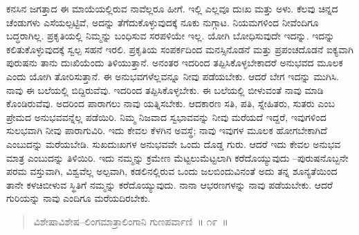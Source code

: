 ಕನಸಿನ ಜಗತ್ತಾದ ಈ ಮಾಯೆಯಲ್ಲಿರುವ ನಾವೆಲ್ಲರೂ ಹೀಗೆ. ಇಲ್ಲಿ ಎಲ್ಲವೂ ದುಃಖ ಮತ್ತು ಅಳು. ಕೆಲವು ಚಿನ್ನದ ಚೆಂಡುಗಳು ಎಸೆಯಲ್ಪಟ್ಟಿವೆ, ಅದನ್ನು ತೆಗೆದುಕೊಳ್ಳುವುದಕ್ಕೆ ನೂಕು ನುಗ್ಗಾಟ. ನಿಯಮಗಳಿಂದ ನೀವೆಂದಿಗೂ ಬದ್ಧರಾಗಿಲ್ಲ. ಪ್ರಕೃತಿಯಲ್ಲಿ ನಿಮ್ಮನ್ನು ಬಂಧಿಸುವ ಸರಪಳಿಯೇ ಇಲ್ಲ. ಯೋಗಿ ಬೋಧಿಸುವುದೇ ಇದನ್ನು. ಇದನ್ನು ಕಲಿತುಕೊಳ್ಳುವುದಕ್ಕೆ ಸ್ವಲ್ಪ ಸಹನೆ ಇರಲಿ. ಪ್ರಕೃತಿಯ ಸಂಪರ್ಕದಿಂದ ಮನಸ್ಸಿನೊಡನೆ ಮತ್ತು ಪ್ರಪಂಚದೊಡನೆ ಐಕ್ಯವಾಗಿ ಪುರುಷನು ತಾನು ದುಃಖಿಯೆಂದು ತಿಳಿಯುತ್ತಾನೆ. ಅನಂತರ ಇದರಿಂದ ತಪ್ಪಿಸಿಕೊಳ್ಳಬೇಕಾದರೆ ಅನುಭವದ ಮೂಲಕ ಎಂದು ಯೋಗಿ ತೋರಿಸುತ್ತಾನೆ. ಈ ಅನುಭವಗಳೆಲ್ಲವನ್ನೂ ನೀವು ಪಡೆಯಬೇಕು. ಆದರೆ ಬೇಗ ಇದನ್ನು ಮುಗಿಸಿ. ನಾವು ಈ ಬಲೆಯಲ್ಲಿ ಬಿದ್ದಿರುವೆವು. ಇದರಿಂದ ತಪ್ಪಿಸಿಕೊಳ್ಳಬೇಕು. ಈ ಬಲೆಯಲ್ಲಿ ಬೀಳುವಂತೆ ನಾವು ಮಾಡಿ ಕೊಂಡಿರುವೆವು. ಅದರಿಂದ ಪಾರಾಗಲು ನಾವು ಯತ್ನಿಸಬೇಕು. ಆದಕಾರಣ ಸತಿ, ಪತಿ, ಸ್ನೇಹಿತರು, ಸುತರು ಎಂಬ ಪ್ರೇಮದ ಅನುಭವವನ್ನೆಲ್ಲ ಪಡೆಯಿರಿ. ನಿಮ್ಮ ನಿಜವಾದ ಸ್ವಭಾವವನ್ನು ನೀವು ಮರೆಯದೆ ಇದ್ದರೆ, ಇವುಗಳಿಂದ ಸುಲಭವಾಗಿ ನೀವು ಪಾರಾಗುವಿರಿ. ಇದು ಕೇವಲ ಕೆಳಗಿನ ಅವಸ್ಥೆ; ನಾವು ಇವುಗಳ ಮೂಲಕ ಹೋಗಬೇಕಾಗಿದೆ ಎಂಬುದನ್ನು ಮರೆಯಬೇಡಿ. ಸುಖದುಃಖಗಳ ಅನುಭವವೇ ಒಂದು ದೊಡ್ಡ ಗುರು. ಆದರೆ ಇದು ಕೇವಲ ಅನುಭವ ಮಾತ್ರ ಎಂಬುದನ್ನು ತಿಳಿಯಿರಿ. ಇದು ನಮ್ಮನ್ನು ಕ್ರಮೇಣ ಮೆಟ್ಟಲುಮೆಟ್ಟಲಾಗಿ ಕರೆದೊಯ್ಯುವುದು –ಪುರುಷನೊಬ್ಬನೇ ಪರಮ ವಸ್ತುವಾಗಿ, ವಿಶ್ವವೆಲ್ಲ ಅಲ್ಪವಾಗಿ, ಕಡಲಿನಲ್ಲಿರುವ ಒಂದು ಜಲಬಿಂದುವಿನಂತೆ ಅದು ತನ್ನ ಶೂನ್ಯತೆಯಿಂದ ತಾನೇ ಕಳಚಿಬೀಳುವ ಸ್ಥಿತಿಗೆ ನಮ್ಮನ್ನು ಕರೆದೊಯ್ಯುವುದು. ನಾನಾ ಆಭರಣಗಳನ್ನು ನಾವು ಪಡೆಯಬೇಕು. ಆದರೆ ಗುರಿಯನ್ನು ನಾವು ಎಂದಿಗೂ ಮರೆಯದಿರಬೇಕು. 


\begin{verse}
ವಿಶೇಷಾವಿಶೇಷ–ಲಿಂಗಮಾತ್ರಾಲಿಂಗಾನಿ ಗುಣಪರ್ವಾಣಿ~॥ ೧೯~॥
\end{verse}

\vspace{-0.3cm}


\eject


